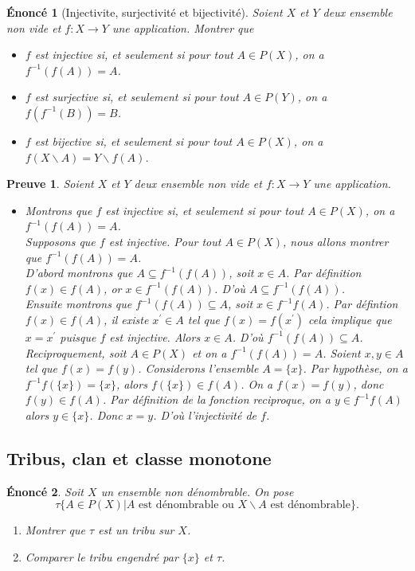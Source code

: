 \documentclass[a4paper, 12pt, french]{article}
\theoremstyle{break}
\newtheorem{enon}{Énoncé}[section]
\newtheorem{preuve}{Preuve}[section]
\begin{document}
\begin{enon}[Injectivite, surjectivité et bijectivité]
	Soient $X$ et $Y$ deux ensemble non vide et $f : X \rightarrow Y$ une application. Montrer que
	\begin{itemize}
		\item[a)] $f$ est injective si, et seulement si pour tout $A \in P(X)$, on a $f^{-1}(f(A)) = A$.
		\item[b)] $f$ est surjective si, et seulement si pour tout $A \in P(Y)$, on a $f(f^{-1}(B)) = B$.
		\item[a)] $f$ est bijective si, et seulement si pour tout $A \in P(X)$, on a $f(X \backslash A)=Y \backslash f(A)$.
	\end{itemize}
\end{enon}

\begin{preuve}
	Soient $X$ et $Y$ deux ensemble non vide et $f : X \rightarrow Y$ une application.
	\begin{itemize}
		\item[a)] Montrons que $f$ est injective si, et seulement si pour tout $A \in P(X)$, on a $f^{-1}(f(A)) = A$.\\
		Supposons que $f$ est injective. Pour tout $A \in P(X)$, nous allons montrer que $f^{-1}(f(A)) = A$.\\
		D'abord montrons que $A \subseteq f^{-1}(f(A))$, soit $x \in A$. Par définition $f(x) \in f(A)$, or $x \in f^{-1}(f(A))$. D'où $A \subseteq f^{-1}(f(A))$.\\ Ensuite montrons que $f^{-1}(f(A)) \subseteq A$, soit $x \in f^{-1}f(A)$. Par défintion $f(x) \in f(A)$, il existe $x^{'} \in A$ tel que $f(x)=f(x^{'})$ cela implique que $x = x^{'}$ puisque $f$ est injective. Alors $x \in A$. D'où $f^{-1}(f(A)) \subseteq A$.\\ Reciproquement, soit $A \in P(X)$ et on a $f^{-1}(f(A)) = A$. Soient $x,y \in A$ tel que $f(x)=f(y)$. Considerons l'ensemble $A=\{x\}$. Par hypothèse, on a $f^{-1}f(\{x\})=\{x\}$, alors $f(\{x\}) \in f(A)$. On a $f(x)=f(y)$, donc $f(y) \in f(A)$. Par définition de la fonction reciproque, on a $y \in f^{-1}f(A)$ alors $y \in \{x\}$. Donc $x=y$. D'où l'injectivité de $f$. \marginpar{$\square$} 
	\end{itemize}
\end{preuve}

\begin{center}\section{Tribus, clan et classe monotone}\end{center}
\begin{enon}
      Soit $X$ un ensemble non dénombrable. On pose $$\tau \{ A \in P(X) | A \mbox{ est dénombrable ou } X \backslash A \mbox{ est dénombrable}\}.$$
      \begin{enumerate}
              \item Montrer que $\tau$ est un tribu sur $X$.
              \item Comparer le tribu engendré par $\{x\}$ et $\tau$.
      \end{enumerate}
\end{enon}
\end{document}
